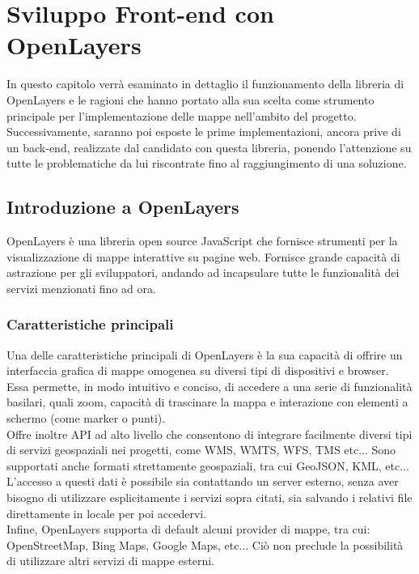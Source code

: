 \chapter{Sviluppo Front-end con OpenLayers}
\label{cap:chapter4}

In questo capitolo verrà esaminato in dettaglio il funzionamento della libreria di OpenLayers e le ragioni che hanno portato alla sua scelta come strumento principale per l'implementazione delle mappe nell'ambito del progetto. Successivamente, saranno poi esposte le prime implementazioni, ancora prive di un back-end, realizzate dal candidato con questa libreria, ponendo l'attenzione su tutte le problematiche da lui riscontrate fino al raggiungimento di una soluzione.

\section{Introduzione a OpenLayers}

OpenLayers è una libreria open source JavaScript che fornisce strumenti per la visualizzazione di mappe interattive su pagine web. Fornisce grande capacità di astrazione per gli sviluppatori, andando ad incapsulare tutte le funzionalità dei servizi menzionati fino ad ora. 

\subsection{Caratteristiche principali}
Una delle caratteristiche principali di OpenLayers è la sua capacità di offrire un interfaccia grafica di mappe omogenea su diversi tipi di dispositivi e browser. Essa permette, in modo intuitivo e conciso, di accedere a una serie di funzionalità basilari, quali zoom, capacità di trascinare la mappa e interazione con elementi a schermo (come marker o punti).
\\Offre inoltre API ad alto livello che consentono di integrare facilmente diversi tipi di servizi geospaziali nei progetti, come WMS, WMTS, WFS, TMS etc...
Sono supportati anche formati strettamente geospaziali, tra cui GeoJSON, KML, etc... L'accesso a questi dati è possibile sia contattando un server esterno, senza aver bisogno di utilizzare esplicitamente i servizi sopra citati, sia salvando i relativi file direttamente in locale per poi accedervi.
\\Infine, OpenLayers supporta di default alcuni provider di mappe, tra cui: OpenStreetMap, Bing Maps, Google Maps, etc... Ciò non preclude la possibilità di utilizzare altri servizi di mappe esterni.

